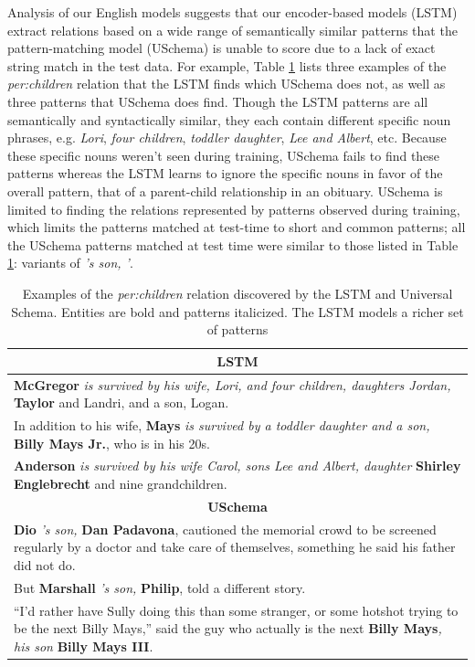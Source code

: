 Analysis of our English models suggests that our encoder-based models (LSTM) extract relations based on a wide range of semantically similar patterns that the pattern-matching model (USchema) is unable to score due to a lack of exact string match in the test data. For example, Table \ref{tab:lstm-us-similar-rels} lists three examples of the \emph{per:children} relation that the LSTM finds which USchema does not, as well as three patterns that USchema does find. Though the LSTM patterns are all semantically and syntactically similar, they each contain different specific noun phrases, e.g. \emph{Lori}, \emph{four children}, \emph{toddler daughter}, \emph{Lee and Albert}, etc. Because these specific nouns weren't seen during training, USchema fails to find these patterns whereas the LSTM learns to ignore the specific nouns in favor of the overall pattern, that of a parent-child relationship in an obituary. USchema is limited to finding the relations represented by patterns observed during training, which limits the patterns matched at test-time to short and common patterns; all the USchema patterns matched at test time were similar to those listed in Table \ref{tab:lstm-us-similar-rels}: variants of \emph{'s son, '}. 


\begin{table}[h]
\begin{center}
\small
\begin{tabular}{|p{7.6cm}|}
\hline
\multicolumn{1}{|c|}{\textbf{LSTM}} \\ \hline
{\bf McGregor} \emph{is survived by his wife, Lori, and four children, daughters Jordan,} { \bf Taylor} and Landri, and a son, Logan. \\ \hline
In addition to his wife, {\bf Mays} \emph{is survived by a toddler daughter and a son,} {\bf Billy Mays Jr.}, who is in his 20s. \\ \hline
{\bf Anderson} \emph{is survived by his wife Carol, sons Lee and Albert, daughter} {\bf Shirley Englebrecht} and nine grandchildren. \\
\hline\hline
\multicolumn{1}{|c|}{\textbf{USchema}}  \\ \hline
{\bf Dio} \emph{'s son,} {\bf Dan Padavona}, cautioned the memorial crowd to be screened regularly by a doctor and take care of themselves, something he said his father did not do. \\ \hline
But {\bf Marshall} \emph{'s son,} {\bf Philip}, told a different story.  \\ \hline
``I'd rather have Sully doing this than some stranger, or some hotshot trying to
be the next Billy Mays,'' said the guy who actually is the next {\bf Billy Mays}\emph{, his son} {\bf Billy Mays III}. \\ 
\hline
\end{tabular}
\caption{Examples of the \emph{per:children} relation discovered by the LSTM and Universal Schema. Entities are bold and patterns italicized. The LSTM models a richer set of patterns \label{tab:lstm-us-similar-rels}}
\end{center}
\end{table}

